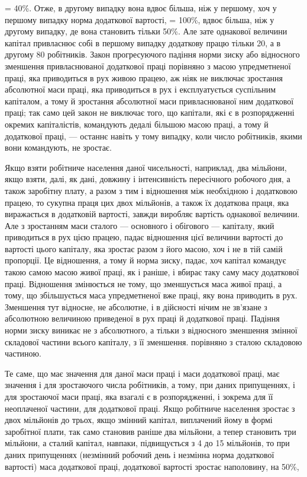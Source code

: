 = 40\%. Отже, в другому випадку вона вдвоє більша, ніж у першому,
хоч у першому випадку норма додаткової вартості, = 100\%,
вдвоє більша, ніж у другому випадку, де вона становить тільки
50\%. Але зате однакової величини капітал привласнює собі в першому
випадку додаткову працю тільки 20, а в другому 80 робітників.
Закон прогресуючого падіння норми зиску або відносного
зменшення привласнюваної додаткової праці порівняно з масою
упредметненої праці, яка приводиться в рух живою працею, аж
ніяк не виключає зростання абсолютної маси праці, яка приводиться
в рух і експлуатується суспільним капіталом, а тому й зростання
абсолютної маси привласнюваної ним додаткової праці; так само
цей закон не виключає того, що капітали, які є в розпорядженні
окремих капіталістів, командують дедалі більшою масою праці,
а тому й додаткової праці, — останнє навіть у тому випадку,
коли число робітників, якими вони командують, не зростає.

Якщо взяти робітниче населення даної чисельності, наприклад,
два мільйони, якщо взяти, далі, як дані, довжину і інтенсивність
пересічного робочого дня, а також заробітну плату,
а разом з тим і відношення між необхідною і додатковою працею,
то сукупна праця цих двох мільйонів, а також їх додаткова
праця, яка виражається в додатковій вартості, завжди виробляє
вартість однакової величини. Але з зростанням маси сталого
— основного і обігового — капіталу, який приводиться в рух
цією працею, падає відношення цієї величини вартості до вартості
цього капіталу, яка зростає разом з його масою, хоч і не в тій
самій пропорції. Це відношення, а тому й норма зиску, падає, хоч
капітал командує такою самою масою живої праці, як і раніше,
і вбирає таку саму масу додаткової праці. Відношення змінюється
не тому, що зменшується маса живої праці, а тому, що збільшується
маса упредметненої вже праці, яку вона приводить в рух.
Зменшення тут відносне, не абсолютне, і в дійсності нічим
не зв’язане з абсолютною величиною приведеної в рух праці
й додаткової праці. Падіння норми зиску виникає не з абсолютного,
а тільки з відносного зменшення змінної складової частини
всього капіталу, з її зменшення. порівняно з сталою складовою
частиною.

Те саме, що має значення для даної маси праці і маси додаткової
праці, має значення і для зростаючого числа робітників, а тому, при
даних припущеннях, і для зростаючої маси праці, яка взагалі
є в розпорядженні, і зокрема для її неоплаченої частини, для
додаткової праці. Якщо робітниче населення зростає з двох мільйонів
до трьох, якщо змінний капітал, виплачений йому в формі
заробітної плати, так само становив раніше два мільйони, а тепер
становить три мільйони, а сталий капітал, навпаки, підвищується
з 4 до 15 мільйонів, то при даних припущеннях (незмінний
робочий день і незмінна норма додаткової вартості) маса додаткової
праці, додаткової вартості зростає наполовину, на 50\%,
